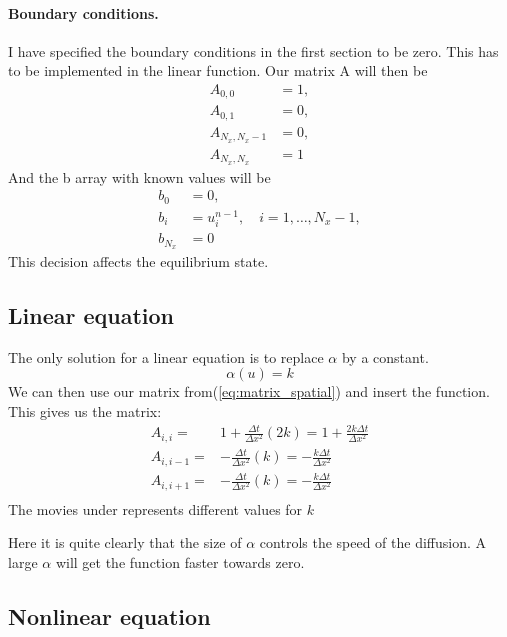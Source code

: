 \documentclass{article}
\begin{document}
\paragraph{Boundary conditions.}
I have specified the boundary conditions in the first section to be zero. This has to be implemented in the linear function.
Our matrix A will then be
\begin{align*}
A_{0,0} &= 1,\\
A_{0,1} &= 0,\\
A_{N_x,N_x-1} &= 0,\\
A_{N_x,N_x} &= 1
\end{align*}
And the b array with known values will be
\begin{align*}
b_0 &= 0,\\
b_i &= u^{n-1}_i,\quad i=1,\ldots,N_x-1,\\
b_{N_x} &= 0 
\end{align*}
This decision affects the equilibrium state. 

\subsection{Linear equation}

The only solution for a linear equation is to replace $\alpha$ by a
constant.
\begin{equation}
	\alpha(u) = k
\end{equation}
We can then use our matrix from(\ref{eq:matrix_spatial}) and insert the function. This gives us
the matrix:
\begin{align*} \label{eq:matrix_constant}
A_{i,i} =& 1+\frac{\Delta t}{\Delta x^2}(2k)=1+\frac{2k\Delta t}{\Delta x^2}\\
A_{i,i-1} =&-\frac{\Delta t}{\Delta x^2}(k)=-\frac{k \Delta t}{\Delta x^2}\\
A_{i,i+1} =&-\frac{\Delta t}{\Delta x^2}(k)=-\frac{k \Delta t}{\Delta x^2}\\
\end{align*}                               
The movies under represents different values for $k$


Here it is quite clearly that the size of $\alpha$ controls the speed of the
diffusion. A large $\alpha$ will get the function faster towards zero. 

\subsection{Nonlinear equation}
\end{document}
